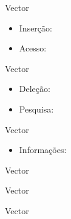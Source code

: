 \begin{frame}[fragile]{Vector}

    \begin{itemize}
        \item Inserção:
        \item Acesso:
    \end{itemize}

\end{frame}

\begin{frame}[fragile]{Vector}

    \begin{itemize}
        \item Deleção:
        \item Pesquisa:
    \end{itemize}

\end{frame}

\begin{frame}[fragile]{Vector}

    \begin{itemize}
        \item Informações:
    \end{itemize}

\end{frame}

\begin{frame}[fragile]{Vector}


\end{frame}

\begin{frame}[fragile]{Vector}


\end{frame}

\begin{frame}[fragile]{Vector}


\end{frame}
